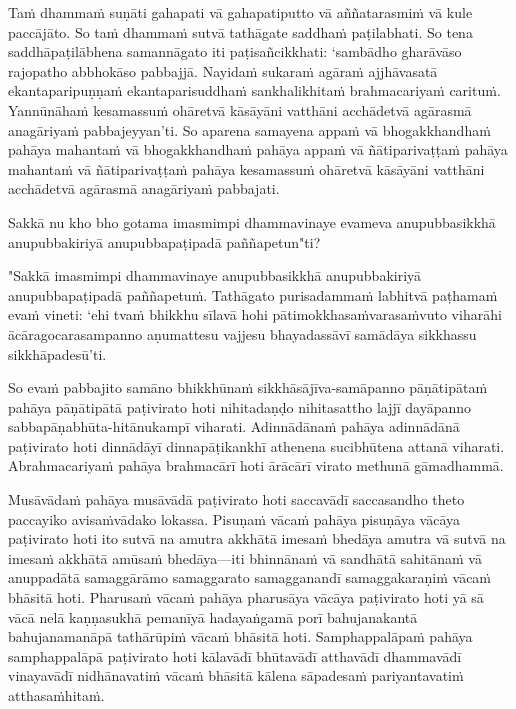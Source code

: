 \begin{leader}
\end{leader}

Taṁ dhammaṁ suṇāti gahapati vā gahapatiputto vā aññatarasmiṁ vā kule paccājāto. So taṁ dhammaṁ sutvā tathāgate saddhaṁ paṭilabhati. So tena saddhāpaṭilābhena samannāgato iti paṭisañcikkhati: ‘sambādho gharāvāso rajopatho abbhokāso pabbajjā. Nayidaṁ sukaraṁ agāraṁ ajjhāvasatā ekantaparipuṇṇaṁ ekantaparisuddhaṁ sankhalikhitaṁ brahmacariyaṁ carituṁ. Yannūnāhaṁ kesamassuṁ ohāretvā kāsāyāni vatthāni acchādetvā agārasmā anagāriyaṁ pabbajeyyan’ti. So aparena samayena appaṁ vā bhogakkhandhaṁ pahāya mahantaṁ vā bhogakkhandhaṁ pahāya appaṁ vā ñātiparivaṭṭaṁ pahāya mahantaṁ vā ñātiparivaṭṭaṁ pahāya kesamassuṁ ohāretvā kāsāyāni vatthāni acchādetvā agārasmā anagāriyaṁ pabbajati.

\suttaRef{[MN 27 / 38 / 51]}

Sakkā nu kho bho gotama imasmimpi dhammavinaye evameva anupubbasikkhā anupubbakiriyā anupubbapaṭipadā paññapetun"ti?

"Sakkā imasmimpi dhammavinaye anupubbasikkhā anupubbakiriyā anupubbapaṭipadā paññapetuṁ. Tathāgato purisadammaṁ labhitvā paṭhamaṁ evaṁ vineti: ‘ehi tvaṁ bhikkhu sīlavā hohi pātimokkhasaṁvarasaṁvuto viharāhi ācāragocarasampanno aṇumattesu vajjesu bhayadassāvī samādāya sikkhassu sikkhāpadesū’ti.

\suttaRef{[MN 107]}

So evaṁ pabbajito samāno bhikkhūnaṁ sikkhāsājīva-samāpanno pāṇātipātaṁ pahāya pāṇātipātā paṭivirato hoti nihitadaṇḍo nihitasattho lajjī dayāpanno sabbapāṇabhūta-hitānukampī viharati. Adinnādānaṁ pahāya adinnādānā paṭivirato hoti dinnādāyī dinnapāṭikankhī athenena sucibhūtena attanā viharati. Abrahmacariyaṁ pahāya brahmacārī hoti ārācārī virato methunā gāmadhammā.

Musāvādaṁ pahāya musāvādā paṭivirato hoti saccavādī saccasandho theto paccayiko avisaṁvādako lokassa. Pisuṇaṁ vācaṁ pahāya pisuṇāya vācāya paṭivirato hoti ito sutvā na amutra akkhātā imesaṁ bhedāya amutra vā sutvā na imesaṁ akkhātā amūsaṁ bhedāya—iti bhinnānaṁ vā sandhātā sahitānaṁ vā anuppadātā samaggārāmo samaggarato samagganandī samaggakaraṇiṁ vācaṁ bhāsitā hoti. Pharusaṁ vācaṁ pahāya pharusāya vācāya paṭivirato hoti yā sā vācā nelā kaṇṇasukhā pemanīyā hadayaṅgamā porī bahujanakantā bahujanamanāpā tathārūpiṁ vācaṁ bhāsitā hoti. Samphappalāpaṁ pahāya samphappalāpā paṭivirato hoti kālavādī bhūtavādī atthavādī dhammavādī vinayavādī nidhānavatiṁ vācaṁ bhāsitā kālena sāpadesaṁ pariyantavatiṁ atthasaṁhitaṁ.


